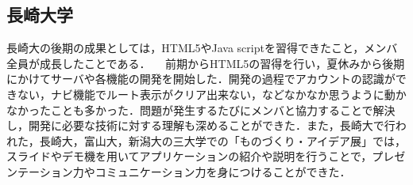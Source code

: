 \subsection{長崎大学}
長崎大の後期の成果としては，HTML5やJava scriptを習得できたこと，メンバ全員が成長したことである．
　前期からHTML5の習得を行い，夏休みから後期にかけてサーバや各機能の開発を開始した．開発の過程でアカウントの認識ができない，ナビ機能でルート表示がクリア出来ない，などなかなか思うように動かなかったことも多かった．問題が発生するたびにメンバと協力することで解決し，開発に必要な技術に対する理解も深めることができた．また，長崎大で行われた，長崎大，富山大，新潟大の三大学での「ものづくり・アイデア展」では，スライドやデモ機を用いてアプリケーションの紹介や説明を行うことで，プレゼンテーション力やコミュニケーション力を身につけることができた．
